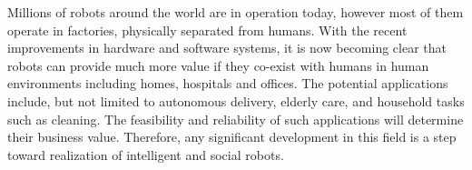 \documentclass{tADR2e}
\begin{document}

Millions of robots around the world are in operation today, however most of them operate in factories, physically separated from humans. With the recent improvements in hardware and software systems, it is now becoming clear that robots can provide much more value if they co-exist with humans in human environments including homes, hospitals and offices. The potential applications include, but not limited to autonomous delivery, elderly care, and household tasks such as cleaning. The feasibility and reliability of such applications will determine their business value. Therefore, any significant development in this field is a step toward realization of intelligent and social robots.
\end{document}
